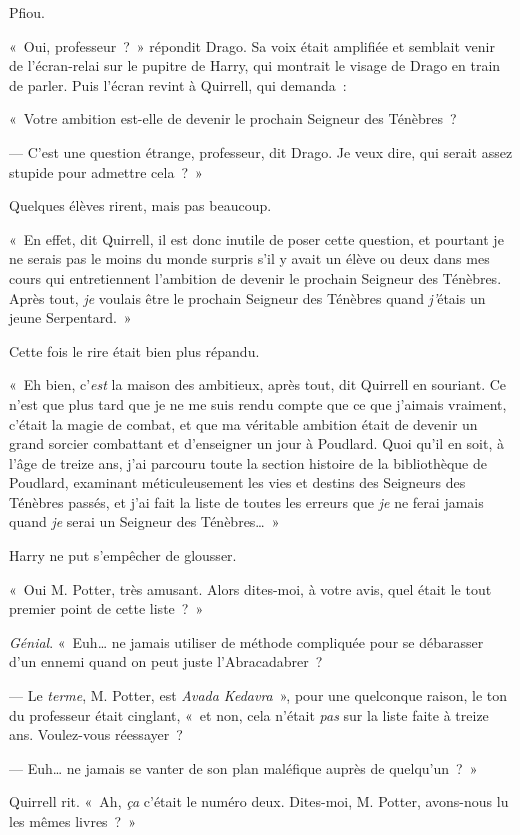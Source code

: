 Pfiou.

«~Oui, professeur~?~» répondit Drago.
Sa voix était amplifiée et semblait venir de l'écran-relai sur le pupitre de Harry, qui montrait le visage de Drago en train de parler.
Puis l'écran revint à Quirrell, qui demanda~:

«~Votre ambition est-elle de devenir le prochain Seigneur des Ténèbres~?

--- C'est une question étrange, professeur, dit Drago.
Je veux dire, qui serait assez stupide pour admettre cela~?~»

Quelques élèves rirent, mais pas beaucoup.

«~En effet, dit Quirrell, il est donc inutile de poser cette question, et pourtant je ne serais pas le moins du monde surpris s'il y avait un élève ou deux dans mes cours qui entretiennent l'ambition de devenir le prochain Seigneur des Ténèbres.
Après tout, \emph{je} voulais être le prochain Seigneur des Ténèbres quand \emph{j'}étais un jeune Serpentard.~»

Cette fois le rire était bien plus répandu.

«~Eh bien, c'\emph{est} la maison des ambitieux, après tout, dit Quirrell en souriant.
Ce n'est que plus tard que je ne me suis rendu compte que ce que j'aimais vraiment, c'était la magie de combat, et que ma véritable ambition était de devenir un grand sorcier combattant et d'enseigner un jour à Poudlard.
Quoi qu'il en soit, à l'âge de treize ans, j'ai parcouru toute la section histoire de la bibliothèque de Poudlard, examinant méticuleusement les vies et destins des Seigneurs des Ténèbres passés, et j'ai fait la liste de toutes les erreurs que \emph{je} ne ferai jamais quand \emph{je} serai un Seigneur des Ténèbres…~»

Harry ne put s'empêcher de glousser.

«~Oui M. Potter, très amusant.
Alors dites-moi, à votre avis, quel était le tout premier point de cette liste~?~»

\emph{Génial}.
«~Euh… ne jamais utiliser de méthode compliquée pour se débarasser d'un ennemi quand on peut juste l'Abracadabrer~?

--- Le \emph{terme}, M. Potter, est \emph{Avada Kedavra}~», pour une quelconque raison, le ton du professeur était cinglant, «~et non, cela n'était \emph{pas} sur la liste faite à treize ans.
Voulez-vous réessayer~?

--- Euh… ne jamais se vanter de son plan maléfique auprès de quelqu'un~?~»

Quirrell rit.
«~Ah, \emph{ça} c'était le numéro deux.
Dites-moi, M. Potter, avons-nous lu les mêmes livres~?~»

